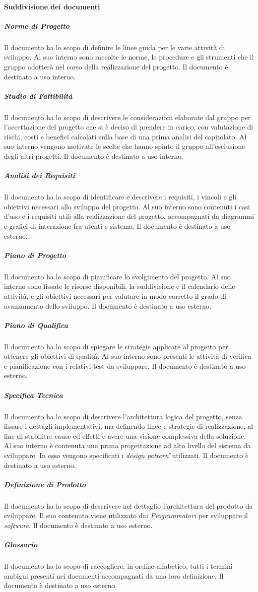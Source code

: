 \paragraph{Suddivisione dei documenti}
\subparagraph{Norme di Progetto}
Il documento ha lo scopo di definire le linee guida per le varie attività di sviluppo. Al suo interno sono raccolte le norme, le procedure e gli strumenti che il gruppo adotterà nel corso della realizzazione del progetto. Il documento è destinato a uso interno.
\subparagraph{Studio di Fattibilità}
Il documento ha lo scopo di descrivere le considerazioni elaborate dal gruppo per l'accettazione del progetto che si è deciso di prendere in carico, con valutazione di rischi, costi e benefici calcolati sulla base di una prima analisi del capitolato. Al suo interno vengono motivate le scelte che hanno spinto il gruppo all'esclusione degli altri progetti. Il documento è destinato a uso interno.
\subparagraph{Analisi dei Requisiti}
Il documento ha lo scopo di identificare e descrivere i requisiti, i vincoli e gli obiettivi necessari allo sviluppo del progetto. Al suo interno sono contenuti i casi d'uso e i requisiti utili alla realizzazione del progetto, accompagnati da diagrammi e grafici di interazione fra utenti e sistema. Il documento è destinato a uso esterno.
\subparagraph{Piano di Progetto}
Il documento ha lo scopo di pianificare lo svolgimento del progetto. Al suo interno sono fissate le risorse disponibili, la suddivisione e il calendario delle attività, e gli obiettivi necessari per valutare in modo corretto il grado di avanzamento dello sviluppo. Il documento è destinato a uso esterno.
\subparagraph{Piano di Qualifica}
Il documento ha lo scopo di spiegare le strategie applicate al progetto per ottenere gli obiettivi di qualità. Al suo interno sono presenti le attività di verifica e pianificazione con i relativi test da sviluppare. Il documento è destinato a uso esterno.
\subparagraph{Specifica Tecnica}
Il documento ha lo scopo di descrivere l'architettura logica del progetto, senza fissare i dettagli implementativi, ma definendo linee e strategie di realizzazione, al fine di stabilitre cause ed effetti e avere una visione complessiva della soluzione. Al suo interno è contenuta una prima progettazione ad alto livello del sistema da sviluppare. In esso vengono specificati i \textit{design pattern}\G\ utilizzati. Il documento è destinato a uso esterno. 
\subparagraph{Definizione di Prodotto}
Il documento ha lo scopo di descrivere nel dettaglio l'architettura del prodotto da sviluppare. Il suo contenuto viene utilizzato dai \textit{Programmatori} per sviluppare il \textit{software}. Il documento è destinato a uso esterno.
\subparagraph{Glossario}
Il documento ha lo scopo di raccogliere, in ordine alfabetico, tutti i termini ambigui presenti nei documenti accompagnati da una loro definizione. Il documento è destinato a uso esterno.

